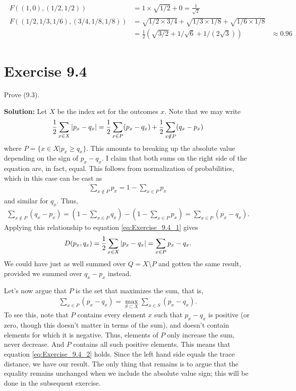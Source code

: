 \documentclass{book}
\begin{document}
    \begin{align}
    \begin{aligned}
        F((1,0),(1/2,1/2)) &= 1\times \sqrt{1/2} + 0 = \frac{1}{\sqrt{2}} \\
        F((1/2,1/3,1/6),(3/4,1/8,1/8)) &= \sqrt{1/2\times 3/4} + \sqrt{1/3\times 1/8}+\sqrt{1/6\times 1/8} \\
        &= \frac{1}{2}(\sqrt{3/2} + 1/\sqrt{6}+1/(2\sqrt{3}))
        &\approx 0.96
    \end{aligned}
    \end{align}

\section*{Exercise 9.4}
    Prove (9.3).
    
    \textbf{Solution:} Let $X$ be the index set for the outcomes $x$. Note that we may write
    \begin{align} \label{eq:Exercise_9.4_1}
        \frac{1}{2}\sum_{x\in X} \abs{p_x-q_x} = \frac{1}{2}\sum_{x\in P} (p_x-q_x) + \frac{1}{2} \sum_{x\notin P} (q_x-p_x)
    \end{align}
    where $P = \{x\in X| p_x \geq q_x\}$. This amounts to breaking up the absolute value depending on the sign of $p_x-q_x$. I claim that both sums on the right side of the equation are, in fact, equal. This follows from normalization of probabilities, which in this case can be cast as 
    \begin{align}
        \sum_{x\notin P} p_x = 1-\sum_{x\in P} p_x
    \end{align}
    and similar for $q_x$. Thus,
    \begin{align}
        \sum_{x\notin P} (q_x-p_x) = (1-\sum_{x\in P}q_x) - (1-\sum_{x\in P}p_x) = \sum_{x\in P }(p_x - q_x).
    \end{align}
    Applying this relationship to equation \eqref{eq:Exercise_9.4_1} gives
    \begin{align}
        D(p_x, q_x) = \frac{1}{2}\sum_{x\in X} \abs{p_x-q_x} = \sum_{x\in P} p_x - q_x.
    \end{align}
    We could have just as well summed over $Q = X\setminus P$ and gotten the same result, provided we summed over $q_x-p_x$ instead. 
    
    Let's now argue that $P$ is the set that maximizes the sum, that is,
    \begin{align} \label{eq:Exercise_9.4_2}
        \sum_{x\in P } (p_x-q_x) = \max_{S\subset X} \sum_{x\in S} (p_x -q_x).
    \end{align}
    To see this, note that $P$ contains every element $x$ such that $p_x-q_x$ is positive (or zero, though this doesn't matter in terms of the sum), and doesn't contain elements for which it is negative. Thus, elements of $P$ only increase the sum, never decrease. And $P$ contains all such positive elements. This means that equation \eqref{eq:Exercise_9.4_2} holds. Since the left hand side equals the trace distance, we have our result. The only thing that remains is to argue that the equality remains unchanged when we include the absolute value sign; this will be done in the subsequent exercise. 
    
\end{document}
